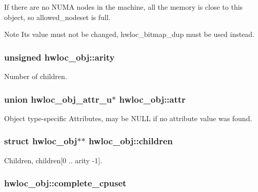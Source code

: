 If there are no NUMA nodes in the machine, all the memory is close to this object, so {\ttfamily allowed\_\-nodeset} is full.

\begin{DoxyNote}{Note}
Its value must not be changed, hwloc\_\-bitmap\_\-dup must be used instead. 
\end{DoxyNote}
\hypertarget{a00016_aac3f6da35c9b57599909a44ce2b716c1}{
\subsubsection[{arity}]{\setlength{\rightskip}{0pt plus 5cm}unsigned {\bf hwloc\_\-obj::arity}}}
\label{a00016_aac3f6da35c9b57599909a44ce2b716c1}


Number of children. 

\hypertarget{a00016_accd40e29f71f19e88db62ea3df02adc8}{
\subsubsection[{attr}]{\setlength{\rightskip}{0pt plus 5cm}union {\bf hwloc\_\-obj\_\-attr\_\-u}$\ast$ {\bf hwloc\_\-obj::attr}}}
\label{a00016_accd40e29f71f19e88db62ea3df02adc8}


Object type-\/specific Attributes, may be {\ttfamily NULL} if no attribute value was found. 

\hypertarget{a00016_a04d05403da37bfe17cd63b7c7dd07b1f}{
\subsubsection[{children}]{\setlength{\rightskip}{0pt plus 5cm}struct {\bf hwloc\_\-obj}$\ast$$\ast$ {\bf hwloc\_\-obj::children}}}
\label{a00016_a04d05403da37bfe17cd63b7c7dd07b1f}


Children, {\ttfamily children}\mbox{[}0 .. arity -\/1\mbox{]}. 

\hypertarget{a00016_a91788a9da687beb7224cc1fd7b75208c}{
\subsubsection[{complete\_\-cpuset}]{ {\bf hwloc\_\-obj::complete\_\-cpuset}}}
\label{a00016_a91788a9da687beb7224cc1fd7b75208c}


